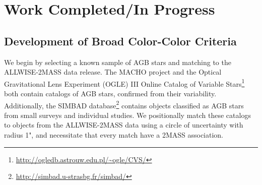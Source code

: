 %

\section{Work Completed/In Progress}
\subsection{Development of Broad Color-Color Criteria}
We begin by selecting a known sample of AGB stars and matching to the ALLWISE-2MASS data release. The MACHO project \citep{2008AJ....136.1242F} and the Optical Gravitational Lens Experiment (OGLE) III Online Catalog of Variable Stars\footnote{\url{http://ogledb.astrouw.edu.pl/~ogle/CVS/}} both contain catalogs of AGB stars, confirmed from their variability. Additionally, the SIMBAD database\footnote{\url{http://simbad.u-strasbg.fr/simbad/}} contains objects classified as AGB stars from small surveys and individual studies. We positionally match these catalogs to objects from the ALLWISE-2MASS data using a circle of uncertainty with radius 1", and necessitate that every match have a 2MASS association.

